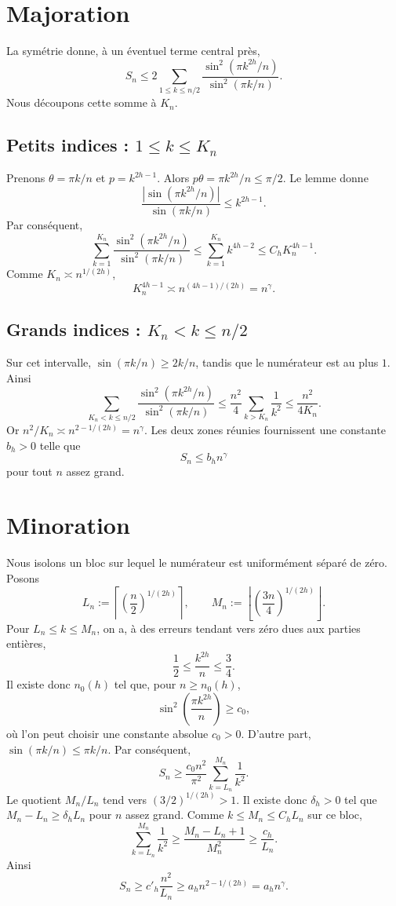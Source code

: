 \documentclass[11pt,a4paper]{article}
\begin{document}
\section{Majoration}

La symétrie donne, à un éventuel terme central près,
\[
S_n\leq2\sum_{1\leq k\leq n/2}
\frac{\sin^2(\pi k^{2h}/n)}{\sin^2(\pi k/n)}.
\]
Nous découpons cette somme à $K_n$.

\subsection{Petits indices : $1\leq k\leq K_n$}

Prenons $\theta=\pi k/n$ et $p=k^{2h-1}$. Alors
$p\theta=\pi k^{2h}/n\leq\pi/2$. Le lemme donne
\[
\frac{|\sin(\pi k^{2h}/n)|}{\sin(\pi k/n)}\leq k^{2h-1}.
\]
Par conséquent,
\[
\sum_{k=1}^{K_n}
\frac{\sin^2(\pi k^{2h}/n)}{\sin^2(\pi k/n)}
\leq\sum_{k=1}^{K_n}k^{4h-2}
\leq C_hK_n^{4h-1}.
\]
Comme $K_n\asymp n^{1/(2h)}$,
\[
K_n^{4h-1}\asymp n^{(4h-1)/(2h)}=n^\gamma.
\]

\subsection{Grands indices : $K_n<k\leq n/2$}

Sur cet intervalle, $\sin(\pi k/n)\geq2k/n$, tandis que le numérateur est
au plus $1$. Ainsi
\[
\sum_{K_n<k\leq n/2}
\frac{\sin^2(\pi k^{2h}/n)}{\sin^2(\pi k/n)}
\leq\frac{n^2}{4}\sum_{k>K_n}\frac1{k^2}
\leq\frac{n^2}{4K_n}.
\]
Or $n^2/K_n\asymp n^{2-1/(2h)}=n^\gamma$. Les deux zones réunies
fournissent une constante $b_h>0$ telle que
\[
S_n\leq b_hn^\gamma
\]
pour tout $n$ assez grand.

\section{Minoration}

Nous isolons un bloc sur lequel le numérateur est uniformément séparé de zéro.
Posons
\[
L_n:=\left\lceil\left(\frac n2\right)^{1/(2h)}\right\rceil,
\qquad
M_n:=\left\lfloor\left(\frac{3n}{4}\right)^{1/(2h)}\right\rfloor.
\]
Pour $L_n\leq k\leq M_n$, on a, à des erreurs tendant vers zéro dues aux
parties entières,
\[
\frac12\leq\frac{k^{2h}}n\leq\frac34.
\]
Il existe donc $n_0(h)$ tel que, pour $n\geq n_0(h)$,
\[
\sin^2\left(\frac{\pi k^{2h}}n\right)\geq c_0,
\]
où l'on peut choisir une constante absolue $c_0>0$. D'autre part,
$\sin(\pi k/n)\leq\pi k/n$. Par conséquent,
\[
S_n\geq\frac{c_0n^2}{\pi^2}
\sum_{k=L_n}^{M_n}\frac1{k^2}.
\]
Le quotient $M_n/L_n$ tend vers $(3/2)^{1/(2h)}>1$. Il existe donc
$\delta_h>0$ tel que $M_n-L_n\geq\delta_hL_n$ pour $n$ assez grand. Comme
$k\leq M_n\leq C_hL_n$ sur ce bloc,
\[
\sum_{k=L_n}^{M_n}\frac1{k^2}
\geq\frac{M_n-L_n+1}{M_n^2}
\geq\frac{c_h}{L_n}.
\]
Ainsi
\[
S_n\geq c'_h\frac{n^2}{L_n}
\geq a_hn^{2-1/(2h)}=a_hn^\gamma.
\]
\end{document}
